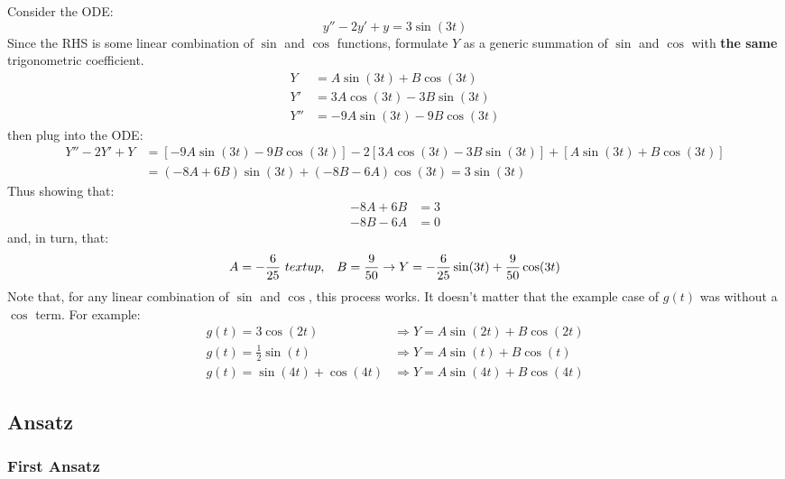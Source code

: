 \documentclass[12pt]{article}
\begin{document}
Consider the ODE:
\begin{equation*}
  y'' - 2y' + y = 3\sin(3t)
\end{equation*}
Since the RHS is some linear combination of $\sin$ and $\cos$ functions, formulate $Y$ as a generic summation of $\sin$ and $\cos$ with \textbf{the same} trigonometric coefficient.
\begin{align*}
  Y   &= A\sin(3t) + B\cos(3t) \\
  Y'  &= 3A\cos(3t) - 3B\sin(3t) \\
  Y'' &= -9A\sin(3t) - 9B\cos(3t)
\end{align*}
then plug into the ODE:
\begin{align*}
  Y'' - 2Y' + Y &= \left[-9A\sin(3t) - 9B\cos(3t)\right] - 2\left[3A\cos(3t) - 3B\sin(3t)\right] + \left[A\sin(3t) + B\cos(3t)\right] \\
                &= (-8A+6B)\sin(3t) + (-8B-6A)\cos(3t) = 3\sin(3t)
\end{align*}
Thus showing that:
\begin{align*}
  -8A + 6B &= 3 \\
  -8B - 6A &= 0
\end{align*}
and, in turn, that:
\begin{equation*}
  A = -\frac{6}{25}\ \ \\textup{,}\ \ \ B =  \frac{9}{50} \rightarrow Y = -\frac{6}{25}\sin(3t)+\frac{9}{50}\cos(3t)
\end{equation*}
Note that, for any linear combination of $\sin$ and $\cos$, this process works. It doesn't matter that the example case of $g(t)$ was without a $\cos$ term. For example:
\begin{align*}
  g(t) = 3\cos(2t)              &\Rightarrow Y = A\sin(2t) + B\cos(2t) \\
  g(t) = \frac{1}{2}\sin(t)     &\Rightarrow Y = A\sin(t) + B\cos(t) \\
  g(t) = \sin(4t) + \cos(4t)    &\Rightarrow Y = A\sin(4t) + B\cos(4t)
\end{align*}

\subsection{Ansatz}
\label{ssec:ansatz}

\subsubsection{First Ansatz}
\label{sssec:firstAnsatz}
\end{document}
